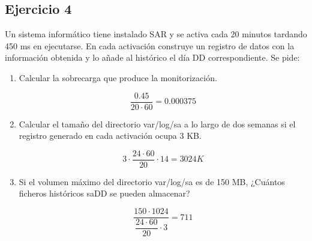 \subsection{Ejercicio 4}
\noindent
Un sistema informático tiene instalado SAR y se activa cada 20 minutos tardando 450 ms en ejecutarse. En cada activación construye un registro de datos con la información obtenida y lo añade al histórico el día DD correspondiente. Se pide:
\begin{enumerate}
    \item Calcular la sobrecarga que produce la monitorización.
\begin{tcolorbox}[colback=white,colframe=cyan!50!black,fonttitle=\bfseries]
\[
\dfrac{0.45}{20\cdot 60}=0.000375
\]
\end{tcolorbox}    
    \item Calcular el tamaño del directorio var/log/sa a lo largo de dos semanas si el registro generado en cada activación ocupa 3 KB.
\begin{tcolorbox}[colback=white,colframe=cyan!50!black,fonttitle=\bfseries]
\[
3\cdot\dfrac{24\cdot 60}{20}\cdot 14=3024K
\]
\end{tcolorbox}    
    \item Si el volumen máximo del directorio var/log/sa es de 150 MB, ¿Cuántos ficheros históricos saDD se pueden almacenar?
\begin{tcolorbox}[colback=white,colframe=cyan!50!black,fonttitle=\bfseries]
\[
\dfrac{150\cdot 1024}{\dfrac{24\cdot 60}{20}\cdot 3}=711
\]
\end{tcolorbox}    
\end{enumerate}
